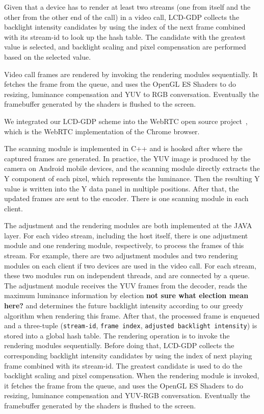 Given that a device has to render at least two streams 
(one from itself and the other from the other end of the call) in a video call,
LCD-GDP collects the backlight intensity candidates by using the index of the next
frame combined with its stream-id to look up the hash table.
The candidate with the greatest value is selected, and 
backlight scaling and pixel compensation are performed based on the selected value.

Video call frames are rendered by invoking the rendering modules
sequentially. It fetches the frame from the queue, and uses the
OpenGL ES Shaders to do resizing, luminance compensation and YUV to RGB
conversation. Eventually the framebuffer generated by the shaders is
flushed to the screen. 


We integrated our LCD-GDP scheme into the WebRTC open
source project~\cite{webrtcproject}, which is the WebRTC implementation of the Chrome
browser. 


The scanning module is implemented in C++ and is hooked after
where the captured frames are generated.  In practice, the YUV image
is produced by the camera on Android mobile devices, and the scanning
module directly extracts the Y component of each pixel, which represents
the luminance. Then the resulting Y value is written into the Y data
panel in multiple positions. After that, the updated frames are sent
to the encoder. There is one scanning module  in each client.

The adjustment and the rendering modules are both
implemented at the JAVA layer. For each
video stream, including the host itself, there is one adjustment
module and one rendering module, respectively, to process the
frames of this stream. For example, there are two adjustment modules and two
rendering modules on each client if two devices are used in
the video call. For each stream, these two modules run on
independent threads, and are connected by a queue. The 
  adjustment module receives the YUV frames from the decoder, reads the
maximum luminance information by election {\bf not sure what election
  mean here?} and determines the future
backlight intensity according to our greedy algorithm when rendering this frame. After that,
the processed frame is  enqueued and a three-tuple ({\tt stream-id},
{\tt frame index}, 
{\tt adjusted backlight intensity}) is stored into a global hash
table. The rendering operation is to invoke the rendering modules
sequentially. Before doing that, LCD-GDP collects the corresponding
backlight intensity candidates by using the index of next playing
frame combined with its stream-id. The greatest candidate is used
to do the backlight scaling and pixel compensation. When the rendering
module is invoked, it fetches the frame from the queue, and uses the
OpenGL ES Shaders to do resizing, luminance compensation and YUV-RGB
conversation. Eventually the framebuffer generated by the shaders is
flushed to the screen. 



